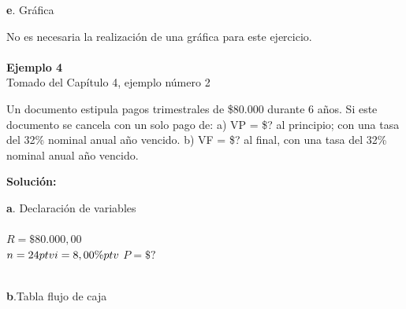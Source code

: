 \textbf{e}. Gráfica

\vspace{2mm}

No es necesaria la realización de una gráfica para este ejercicio.
\\\\
\textbf{Ejemplo 4}\\

Tomado del Capítulo 4, ejemplo número 2

\vspace{2mm}

Un documento estipula pagos trimestrales de \$80.000 durante 6 años. Si este documento se cancela con un solo pago de:
a) VP = \$? al principio; con una tasa del 32\% nominal anual año vencido.
b) VF = \$? al final, con una tasa del 32\% nominal anual año vencido.

\vspace{2mm}

\textbf{Solución:}
\vspace{2mm}

\textbf{a}. Declaración de variables\\

\\

	
	    $R=\$80.000,00$\\
	$	n=24 ptv 
		\\
		i=8,00\% ptv
		\\
		$	$P=\$?$
	
\\

\textbf{b}.Tabla flujo de caja
\\

\vspace{2mm}


